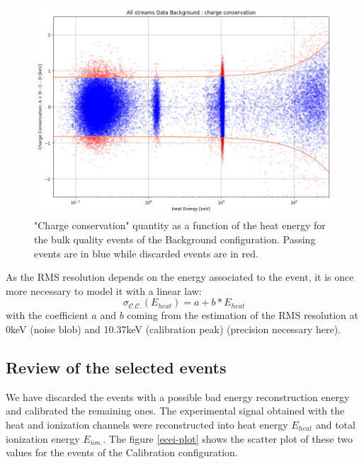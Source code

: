 \begin{figure}
\centering
\includegraphics[width=\linewidth,]{Figures/Neutron/charge_conservation.png}
\caption{"Charge conservation" quantity as a function of the heat energy for the bulk quality events of the Background configuration. Passing events are in blue while discarded events are in red.}
\label{fig:charge-conservation}
\end{figure}

As the RMS resolution depends on the energy associated to the event, it is once more necessary to model it with a linear law:
\begin{equation}
\sigma_{\mathcal{C.C.}}\left(E_{heat}\right)
=
a + b*E_{heat}
\end{equation}
with the coefficient $a$ and $b$ coming from the estimation of the RMS resolution at 0keV (noise blob) and 10.37keV (calibration peak) (precision necessary here).

\subsection{Review of the selected events}

We have discarded the events with a possible bad energy reconstruction energy and calibrated the remaining ones. The experimental signal obtained with the heat and ionization channels were reconstructed into heat energy $E_{heat}$ and total ionization energy $E_{ion.}$. The figure \ref{ecei-plot} shows the scatter plot of these two values for the events of the Calibration configuration.

